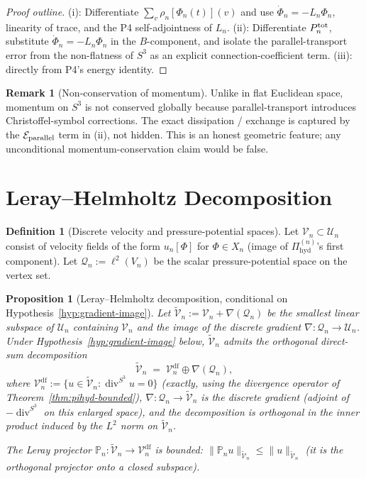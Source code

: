 \documentclass[11pt, a4paper]{amsart}
\newtheorem{proposition}[theorem]{Proposition}
\theoremstyle{definition}
\newtheorem{definition}[theorem]{Definition}
\newtheorem{remark}[theorem]{Remark}
\newcommand{\Pihyd}{\Pi_{\mathrm{hyd}}}
\newcommand{\divS}{\operatorname{div}^{S^3}}
\newcommand{\Projn}{\mathbb P_n}
\newcommand{\Vdf}{\mathcal V_n^{\mathrm{df}}}
\begin{document}
\begin{proof}[Proof outline]
(i): Differentiate $\sum_v \rho_n[\Phi_n(t)](v)$ and use
$\dot \Phi_n = -L_n \Phi_n$, linearity of trace, and the P4
self-adjointness of $L_n$. (ii): Differentiate
$P_n^{\rm tot}$, substitute $\dot\Phi_n = -L_n \Phi_n$ in the
$B$-component, and isolate the parallel-transport error from
the non-flatness of $S^3$ as an explicit connection-coefficient
term. (iii): directly from P4's energy identity.
\end{proof}

\begin{remark}[Non-conservation of momentum]
\label{rmk:momentum}
Unlike in flat Euclidean space, momentum on $S^3$ is not
conserved globally because parallel-transport introduces
Christoffel-symbol corrections. The exact dissipation /
exchange is captured by the $\mathcal E_{\rm parallel}$ term in
(ii), not hidden. This is an honest geometric feature; any
unconditional momentum-conservation claim would be false.
\end{remark}

\section{Leray--Helmholtz Decomposition}
\label{sec:leray}

\begin{definition}[Discrete velocity and pressure-potential spaces]
\label{def:VQ}
Let $\mathcal V_n \subset \mathcal U_n$ consist of velocity
fields of the form $u_n[\Phi]$ for $\Phi \in X_n$ (image of
$\Pihyd^{(n)}$'s first component). Let $\mathcal Q_n :=
\ell^2(V_n)$ be the scalar pressure-potential space on the
vertex set.
\end{definition}

\begin{proposition}[Leray--Helmholtz decomposition, conditional on Hypothesis~\ref{hyp:gradient-image}]
\label{prop:leray}
Let $\widetilde{\mathcal V}_n := \mathcal V_n + \nabla(\mathcal Q_n)$
be the smallest linear subspace of $\mathcal U_n$ containing
$\mathcal V_n$ and the image of the discrete gradient
$\nabla \colon \mathcal Q_n \to \mathcal U_n$. Under
Hypothesis~\ref{hyp:gradient-image} below, $\widetilde{\mathcal V}_n$
admits the orthogonal direct-sum decomposition
\[
  \widetilde{\mathcal V}_n \;=\; \Vdf \oplus \nabla(\mathcal Q_n),
\]
where $\Vdf := \{u \in \widetilde{\mathcal V}_n : \divS u = 0\}$
(exactly, using the divergence operator of
Theorem~\ref{thm:pihyd-bounded}), $\nabla \colon \mathcal Q_n \to
\widetilde{\mathcal V}_n$ is the discrete gradient (adjoint of
$-\divS$ on this enlarged space), and the decomposition is
orthogonal in the inner product induced by the $L^2$ norm on
$\widetilde{\mathcal V}_n$.

The \emph{Leray projector} $\Projn \colon \widetilde{\mathcal V}_n
\to \Vdf$ is bounded: $\|\Projn u\|_{\widetilde{\mathcal V}_n} \leq
\|u\|_{\widetilde{\mathcal V}_n}$ (it is the orthogonal projector
onto a closed subspace).
\end{proposition}
\end{document}
